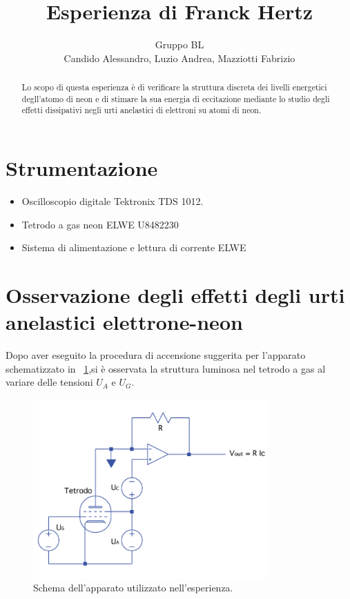 \documentclass[10pt,a4paper]{article}
\title{Esperienza di Franck Hertz}
\author{Gruppo BL \\ Candido Alessandro, Luzio Andrea, Mazziotti Fabrizio}
\begin{document}
\maketitle

\begin{abstract}
Lo scopo di questa esperienza è di verificare la struttura discreta dei livelli energetici degll'atomo di neon e di stimare la sua energia di eccitazione mediante lo studio degli effetti dissipativi negli urti anelastici di elettroni su atomi di neon.
\end{abstract}

\section{Strumentazione }

\begin{itemize}
 \item Oscilloscopio digitale Tektronix TDS 1012.
 \item Tetrodo a gas neon ELWE U8482230
 \item Sistema di alimentazione e lettura di corrente ELWE

\end{itemize}

\section{Osservazione degli effetti degli urti anelastici elettrone-neon}

Dopo aver eseguito la procedura di accensione suggerita per l'apparato schematizzato in \figurename{~\ref{fig:circuito}},si è osservata la struttura luminosa nel tetrodo a gas al variare delle tensioni $U_{A}$ e $U_{G}$.

\begin{figure}[h!]
	\centering
		\includegraphics[width=0.80\textwidth]{../grafici/schema_apparato.png}
	\caption{Schema dell'apparato utilizzato nell'esperienza.}
	\label{fig:circuito}
\end{figure}
\end{document}

